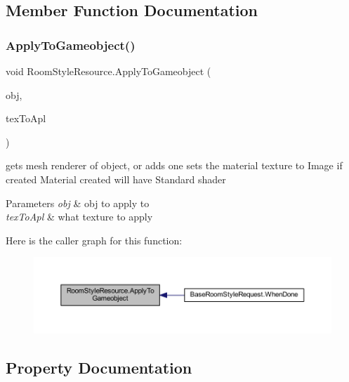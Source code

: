 \subsection{Member Function Documentation}
\mbox{\label{class_room_style_resource_a631919fd4d90b01b2bfad87a30a6b7b2}} 
\subsubsection{\texorpdfstring{Apply\+To\+Gameobject()}{ApplyToGameobject()}}
{\footnotesize\ttfamily void Room\+Style\+Resource.\+Apply\+To\+Gameobject (\begin{DoxyParamCaption}\item[{Game\+Object}]{obj,  }\item[{\mbox{\hyperlink{class_room_style_resource_a877062d3830671f8376cc30340cdb45f}{Texture\+To\+Apply}}}]{tex\+To\+Apl }\end{DoxyParamCaption})}



gets mesh renderer of object, or adds one sets the material texture to Image if created Material created will have Standard shader 


\begin{DoxyParams}{Parameters}
{\em obj} & obj to apply to\\
\hline
{\em tex\+To\+Apl} & what texture to apply\\
\hline
\end{DoxyParams}
Here is the caller graph for this function\+:
\nopagebreak
\begin{figure}[H]
\begin{center}
\leavevmode
\includegraphics[width=350pt]{class_room_style_resource_a631919fd4d90b01b2bfad87a30a6b7b2_icgraph}
\end{center}
\end{figure}


\subsection{Property Documentation}
\mbox{\label{class_room_style_resource_ab07f5729c88a8a7229e1e625ef859d38}} 

